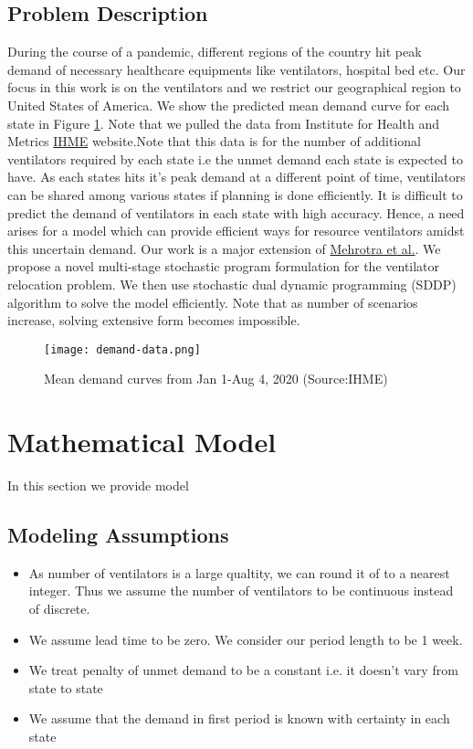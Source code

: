 \documentclass[11pt,letterpaper]{article}
\begin{document}
\subsection*{Problem Description}
During the course of a pandemic, different regions of the country hit peak demand of necessary healthcare equipments like ventilators, hospital bed etc. Our focus in this work is on the ventilators and we restrict our geographical region to United States of America. We show the predicted mean demand curve for each state in Figure \ref{fig:meanDemand}. Note that we pulled the data from Institute for Health and Metrics \href{http://www.healthdata.org/covid/data-downloads}{IHME} website.Note that this data is for the number of additional ventilators required by each state i.e the unmet demand each state is expected to have.
As each states hits it's peak demand at a different point of time, ventilators can be shared among various states if planning is done efficiently. It is difficult to predict the demand of ventilators in each state with high accuracy. Hence, a need arises for a model which can provide efficient ways for resource ventilators amidst this uncertain demand. Our work is a major extension of   
 \href{http://www.optimization-online.org/DB_FILE/2020/04/7719.pdf}{Mehrotra et al.}. We propose a novel multi-stage stochastic program formulation for the ventilator relocation problem. We then use stochastic dual dynamic programming (SDDP) algorithm to solve the model efficiently. Note that as number of scenarios increase, solving extensive form becomes impossible.
 \begin{figure}[h!]
    \centering
    \texttt{[image: demand-data.png]}
    \caption{Mean demand curves from Jan 1-Aug 4, 2020 (Source:IHME)}
    \label{fig:meanDemand}
\end{figure}
 \section{Mathematical Model}
 In this section we provide model
 \subsection{Modeling Assumptions}
 \begin{itemize}
     \item As number of ventilators is a large qualtity, we can round it of to a nearest integer. Thus we assume the number of ventilators to be continuous instead of discrete. 
     \item We assume lead time to be zero. We consider our period length to be 1 week. 
     \item We treat penalty of unmet demand to be a constant i.e. it doesn't vary from state to state
     \item We assume that the demand in first period is known with certainty in each state
 \end{itemize}
\end{document}
